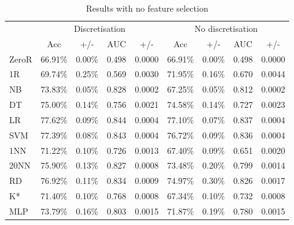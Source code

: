 \begin{table}[htbp]
\caption{Results with no feature selection}
\begin{tabular}{|l|cccc|cccc|}
\hline
 & \multicolumn{ 4}{c|}{Discretisation} & \multicolumn{ 4}{c|}{No discretisation} \\
 & Acc & +/- & \multicolumn{1}{c}{AUC} & \multicolumn{1}{c|}{+/-} & Acc & +/- & \multicolumn{1}{c}{AUC} & \multicolumn{1}{c|}{+/-} \\ \hline
ZeroR & 66.91\% & 0.00\% & 0.498 & 0.0000 & 66.91\% & 0.00\% & 0.498 & 0.0000 \\
1R & 69.74\% & 0.25\% & 0.569 & 0.0030 & 71.95\% & 0.16\% & 0.670 & 0.0044 \\
NB & 73.83\% & 0.05\% & 0.828 & 0.0002 & 67.25\% & 0.05\% & 0.812 & 0.0002 \\
DT & 75.00\% & 0.14\% & 0.756 & 0.0021 & 74.58\% & 0.14\% & 0.727 & 0.0023 \\
LR & 77.62\% & 0.09\% & 0.844 & 0.0004 & 77.10\% & 0.07\% & 0.837 & 0.0004 \\
SVM & 77.39\% & 0.08\% & 0.843 & 0.0004 & 76.72\% & 0.09\% & 0.836 & 0.0004 \\ 
1NN & 71.22\% & 0.10\% & 0.726 & 0.0013 & 67.40\% & 0.09\% & 0.651 & 0.0020 \\ 
20NN & 75.90\% & 0.13\% & 0.827 & 0.0008 & 73.48\% & 0.20\% & 0.799 & 0.0014 \\
RD & 76.92\% & 0.11\% & 0.834 & 0.0009 & 74.97\% & 0.30\% & 0.826 & 0.0017 \\
K* & 71.40\% & 0.10\% & 0.768 & 0.0008 & 67.34\% & 0.10\% & 0.732 & 0.0008 \\
MLP & 73.79\% & 0.16\% & 0.803 & 0.0015 & 71.87\% & 0.19\% & 0.780 & 0.0015 \\ \hline
\end{tabular}
\label{}
\end{table}
